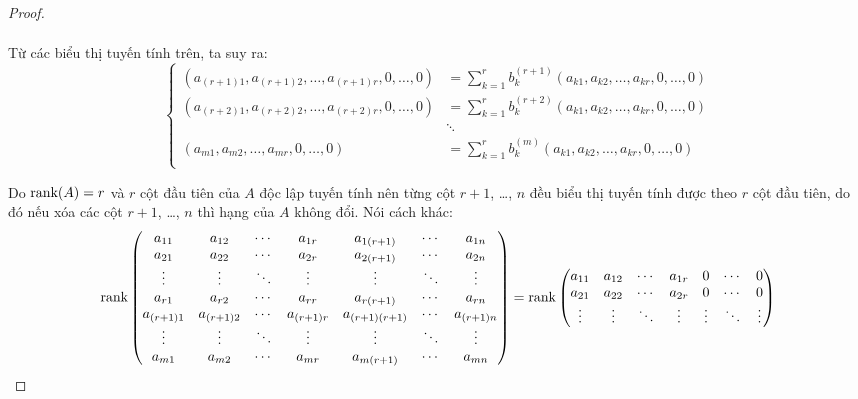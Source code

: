 \documentclass[class=nhvh-linear-algebra,crop=false]{standalone}
\begin{document}
\begin{proof}
\begin{align*}
	\end{align*}
	\par Từ các biểu thị tuyến tính trên, ta suy ra:
	\[
		\begin{cases}
			(a_{(r+1)1}, a_{(r+1)2}, \ldots, a_{(r+1)r}, 0, \ldots, 0) & = \sum^{r}_{k=1}b_{k}^{(r+1)}(a_{k1}, a_{k2}, \ldots, a_{kr}, 0, \ldots, 0) \\
			(a_{(r+2)1}, a_{(r+2)2}, \ldots, a_{(r+2)r}, 0, \ldots, 0) & = \sum^{r}_{k=1}b_{k}^{(r+2)}(a_{k1}, a_{k2}, \ldots, a_{kr}, 0, \ldots, 0) \\
			                                                           & \ddots                                                                      \\
			(a_{m1}, a_{m2}, \ldots, a_{mr}, 0, \ldots, 0)             & = \sum^{r}_{k=1}b_{k}^{(m)}(a_{k1}, a_{k2}, \ldots, a_{kr}, 0, \ldots, 0)   \\
		\end{cases}
		\tag{$\star$}
	\]
	\par Do $\text{rank}(A) = r$ và $r$ cột đầu tiên của $A$ độc lập tuyến tính nên từng cột $r+1$, \ldots, $n$ đều biểu thị tuyến tính được theo $r$ cột đầu tiên, do đó nếu xóa các cột $r+1$, \ldots, $n$ thì hạng của $A$ không đổi. Nói cách khác:
	\[
		\text{rank}
		\begin{pmatrix}
			a_{11}     & a_{12}     & \cdots & a_{1r}     & a_{1(r+1)}     & \cdots & a_{1n}     \\
			a_{21}     & a_{22}     & \cdots & a_{2r}     & a_{2(r+1)}     & \cdots & a_{2n}     \\
			\vdots     & \vdots     & \ddots & \vdots     & \vdots         & \ddots & \vdots     \\
			a_{r1}     & a_{r2}     & \cdots & a_{rr}     & a_{r(r+1)}     & \cdots & a_{rn}     \\
			a_{(r+1)1} & a_{(r+1)2} & \cdots & a_{(r+1)r} & a_{(r+1)(r+1)} & \cdots & a_{(r+1)n} \\
			\vdots     & \vdots     & \ddots & \vdots     & \vdots         & \ddots & \vdots     \\
			a_{m1}     & a_{m2}     & \cdots & a_{mr}     & a_{m(r+1)}     & \cdots & a_{mn}
		\end{pmatrix}
		=
		\text{rank}
		\begin{pmatrix}
			a_{11}     & a_{12}     & \cdots & a_{1r}     & 0      & \cdots & 0      \\
			a_{21}     & a_{22}     & \cdots & a_{2r}     & 0      & \cdots & 0      \\
			\vdots     & \vdots     & \ddots & \vdots     & \vdots & \ddots & \vdots \\

\end{pmatrix}\]
\end{proof}
\end{document}
